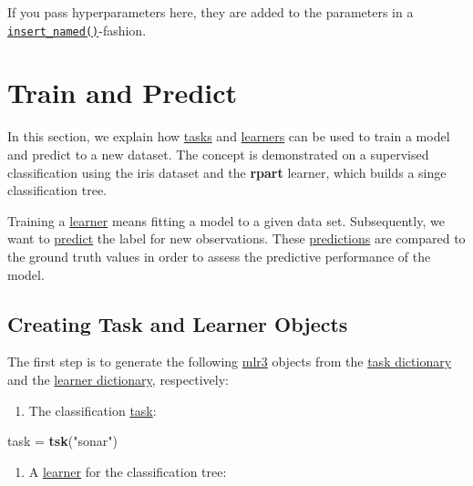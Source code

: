 \documentclass[]{scrbook}
\newenvironment{Shaded}{\begin{snugshade}}{\end{snugshade}}
\newcommand{\KeywordTok}[1]{\textcolor[rgb]{0.13,0.29,0.53}{\textbf{#1}}}
\newcommand{\NormalTok}[1]{#1}
\newcommand{\StringTok}[1]{\textcolor[rgb]{0.31,0.60,0.02}{#1}}
\providecommand{\tightlist}{%
  \setlength{\itemsep}{0pt}\setlength{\parskip}{0pt}}
\renewenvironment{Shaded} {\begin{snugshade}\small} {\end{snugshade}}
\begin{document}
If you pass hyperparameters here, they are added to the parameters in a \href{https://mlr3misc.mlr-org.com/reference/insert_named.html}{\texttt{insert\_named()}}-fashion.

\hypertarget{train-predict}{%
\section{Train and Predict}\label{train-predict}}

In this section, we explain how \protect\hyperlink{tasks}{tasks} and \protect\hyperlink{learners}{learners} can be used to train a model and predict to a new dataset.
The concept is demonstrated on a supervised classification using the iris dataset and the \textbf{rpart} learner, which builds a singe classification tree.

Training a \protect\hyperlink{learners}{learner} means fitting a model to a given data set.
Subsequently, we want to \protect\hyperlink{predicting}{predict} the label for new observations.
These \protect\hyperlink{predicting}{predictions} are compared to the ground truth values in order to assess the predictive performance of the model.

\hypertarget{train-predict-objects}{%
\subsection{Creating Task and Learner Objects}\label{train-predict-objects}}

The first step is to generate the following \href{https://mlr3.mlr-org.com}{mlr3} objects from the \protect\hyperlink{tasks}{task dictionary} and the \protect\hyperlink{learners}{learner dictionary}, respectively:

\begin{enumerate}
\def\labelenumi{\arabic{enumi}.}
\tightlist
\item
  The classification \protect\hyperlink{tasks}{task}:
\end{enumerate}

\begin{Shaded}
\begin{Highlighting}[]
\NormalTok{task =}\StringTok{ }\KeywordTok{tsk}\NormalTok{(}\StringTok{"sonar"}\NormalTok{)}
\end{Highlighting}
\end{Shaded}

\begin{enumerate}
\def\labelenumi{\arabic{enumi}.}
\setcounter{enumi}{1}
\tightlist
\item
  A \protect\hyperlink{learners}{learner} for the classification tree:
\end{enumerate}
\end{document}
